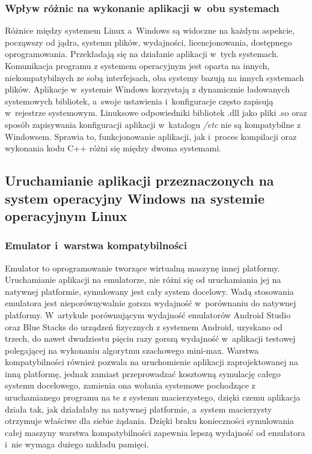 \subsubsection{Wpływ różnic na wykonanie aplikacji w~obu systemach}
Różnice między systemem Linux a~Windows są widoczne na każdym aspekcie, począwszy od jądra, systemu plików, wydajności, licencjonowania, dostępnego oprogramowania. Przekładają się na działanie aplikacji w~tych systemach. Komunikacja programu z systemem operacyjnym jest oparta na innych, niekompatybilnych ze sobą interfejsach, oba systemy bazują na innych systemach plików. Aplikacje w~systemie Windows korzystają z dynamicznie ładowanych systemowych bibliotek, a~swoje ustawienia i~konfiguracje często zapisują w~rejestrze systemowym. Linuksowe odpowiedniki bibliotek .dll jako pliki .so oraz sposób zapisywania konfiguracji aplikacji w~katalogu \textit{/etc} nie są kompatybilne z Windowsem. Sprawia to, funkcjonowanie aplikacji, jak i~proces kompilacji oraz wykonania kodu C++ różni się między dwoma systemami.

\subsection{Uruchamianie aplikacji przeznaczonych na system operacyjny Windows na systemie operacyjnym Linux}
\subsubsection{Emulator i~warstwa kompatybilności}
Emulator to oprogramowanie tworzące wirtualną maszynę innej platformy. Uruchamianie aplikacji na emulatorze, nie różni się od uruchamiania jej na natywnej platformie, symulowany jest cały system docelowy. Wadą stosowania emulatora jest nieporównywalnie gorsza wydajność w~porównaniu do natywnej platformy. W~artykule\cite{emulatorPerformance} porównującym wydajność emulatorów Android Studio oraz Blue Stacks do urządzeń fizycznych z systemem Android, uzyskano od trzech, do nawet dwudziestu pięciu razy gorszą wydajność w~aplikacji testowej polegającej na wykonaniu algorytmu szachowego mini-max. Warstwa kompatybilności również pozwala na uruchomienie aplikacji zaprojektowanej na inną platformę, jednak zamiast przeprowadzać kosztowną symulację całego systemu docelowego, zamienia ona wołania systemowe pochodzące z uruchamianego programu na te z systemu macierzystego, dzięki czemu aplikacja działa tak, jak działałaby na natywnej platformie, a~system macierzysty otrzymuje właściwe dla siebie żądania. Dzięki braku konieczności symulowania całej maszyny warstwa kompatybilności zapewnia lepszą wydajność od emulatora i~nie wymaga dużego nakładu pamięci.

